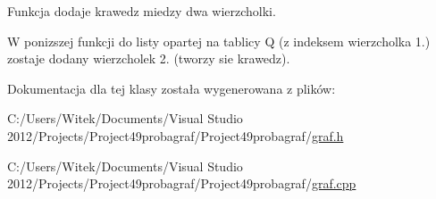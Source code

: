 Funkcja dodaje krawedz miedzy dwa wierzcholki. 

W ponizszej funkcji do listy opartej na tablicy Q (z indeksem wierzcholka 1.) zostaje dodany wierzcholek 2. (tworzy sie krawedz). 

Dokumentacja dla tej klasy została wygenerowana z plików\-:\begin{DoxyCompactItemize}
\item 
C\-:/\-Users/\-Witek/\-Documents/\-Visual Studio 2012/\-Projects/\-Project49probagraf/\-Project49probagraf/\hyperlink{graf_8h}{graf.\-h}\item 
C\-:/\-Users/\-Witek/\-Documents/\-Visual Studio 2012/\-Projects/\-Project49probagraf/\-Project49probagraf/\hyperlink{graf_8cpp}{graf.\-cpp}\end{DoxyCompactItemize}
